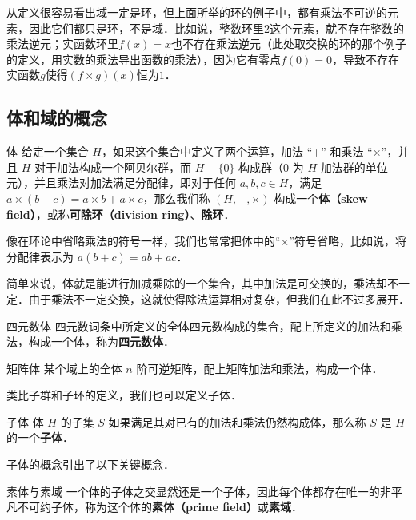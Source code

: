 从定义很容易看出域一定是环，但上面所举的环的例子中，都有乘法不可逆的元素，因此它们都只是环，不是域．比如说，整数环里$2$这个元素，就不存在整数的乘法逆元；实函数环里$f(x)=x$也不存在乘法逆元（此处取交换的环的那个例子的定义，用实数的乘法导出函数的乘法），因为它有零点$f(0)=0$，导致不存在实函数$g$使得$(f\times g)(x)$恒为$1$．




\subsection{体和域的概念}

\begin{definition}{体}
给定一个集合 $H$，如果这个集合中定义了两个运算，加法 “+” 和乘法 “$\times$”，并且 $H$ 对于加法构成一个阿贝尔群，而 $H-\{0\}$ 构成群（$0$ 为 $H$ 加法群的单位元），并且乘法对加法满足分配律，即对于任何 $a, b, c\in H$，满足 $a\times(b+c)=a\times b+a\times c$，那么我们称 $(H, +, \times)$ 构成一个\textbf{体（skew field）}，或称\textbf{可除环（division ring）}、\textbf{除环}．
\end{definition}

像在环论中省略乘法的符号一样，我们也常常把体中的“$\times$”符号省略，比如说，将分配律表示为 $a(b+c)=ab+ac$．

简单来说，体就是能进行加减乘除的一个集合，其中加法是可交换的，乘法却不一定．由于乘法不一定交换，这就使得除法运算相对复杂，但我们在此不过多展开．

\begin{example}{四元数体}
四元数词条中所定义的全体四元数构成的集合，配上所定义的加法和乘法，构成一个体，称为\textbf{四元数体}．
\end{example}

\begin{example}{矩阵体}
某个域上的全体 $n$ 阶可逆矩阵，配上矩阵加法和乘法，构成一个体．
\end{example}

类比子群和子环的定义，我们也可以定义子体．

\begin{definition}{子体}
体 $H$ 的子集 $S$ 如果满足其对已有的加法和乘法仍然构成体，那么称 $S$ 是 $H$ 的一个\textbf{子体}．
\end{definition}
子体的概念引出了以下关键概念．
\begin{definition}{素体与素域}
一个体的子体之交显然还是一个子体，因此每个体都存在唯一的非平凡不可约子体，称为这个体的\textbf{素体（prime field）}或\textbf{素域}．
\end{definition}

